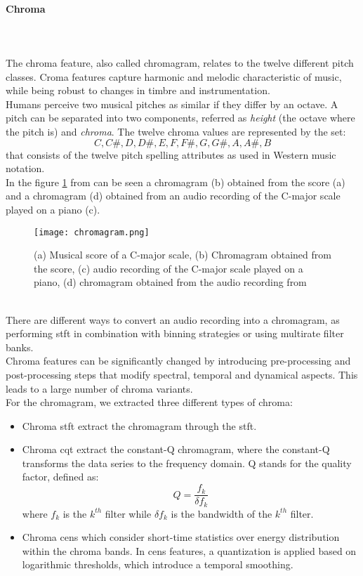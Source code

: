 \paragraph{Chroma}
\mbox{} \\ \\
The chroma feature, also called chromagram, relates to the twelve different pitch classes. Croma features capture harmonic and melodic characteristic of music, while being robust to changes in timbre and instrumentation.
\\
Humans perceive two musical pitches as similar if they differ by an octave. A pitch can be separated into two components, referred as \textit{height} (the octave where the pitch is) and \textit{chroma}. The twelve chroma values are represented by the set:
\[{C, C\#, D, D\#, E , F, F\#, G, G\#, A, A\#, B}\]
that consists of the twelve pitch spelling attributes as used in Western music notation.
\\
In the figure \ref{fig:chromagram} from \cite{inproceedings} can be seen a chromagram (b) obtained from the score (a) and a chromagram (d) obtained from an audio recording of the C-major scale played on a piano (c).
\begin{figure}[h]
    \centering
    \texttt{[image: chromagram.png]} 
	\caption{(a) Musical score of a C-major scale, (b) Chromagram obtained from the score, (c) audio recording of the C-major scale played on a piano, (d) chromagram obtained from the audio recording from \cite{inproceedings}}
    \label{fig:chromagram}
\end{figure}
\\
There are different ways to convert an audio recording into a chromagram, as performing \gls{stft} in combination with binning strategies or using multirate filter banks.
\\ \indent
Chroma features can be significantly changed by introducing pre-processing and post-processing steps that modify spectral, temporal and dynamical aspects. This leads to a large number of chroma variants.
\\
For the chromagram, we extracted three different types of chroma:
\begin{itemize}
	\item Chroma \gls{stft} extract the chromagram through the \gls{stft}.
	\item Chroma cqt extract the constant-Q chromagram, where the constant-Q transforms the data series to the frequency domain. Q stands for the quality factor, defined as:
	\begin{equation}
		Q=\dfrac{f_k}{\delta f_k}
	\end{equation}
	where $f_k$ is the $k^{th}$ filter while $\delta f_k$ is the bandwidth of the $k^{th}$ filter.
	\item Chroma cens which consider short-time statistics over energy distribution within the chroma bands. In \gls{cens} features, a quantization is applied based on logarithmic thresholds, which introduce a temporal smoothing.
\end{itemize}
